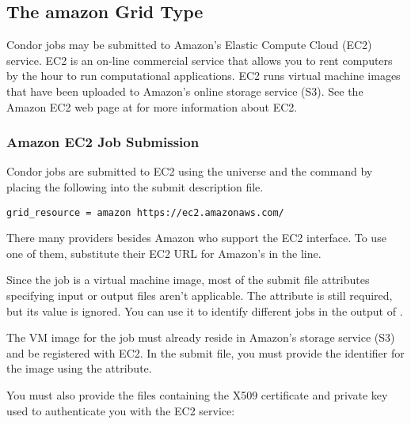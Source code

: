 \subsection{\label{sec:Amazon}The amazon Grid Type }

Condor jobs may be submitted to Amazon's Elastic Compute Cloud (EC2)
service.
EC2 is an on-line commercial service that allows you to rent computers
by the hour to run computational applications.
EC2 runs virtual machine images that have been uploaded to Amazon's
online storage service (S3).
See the Amazon EC2 web page at  for more
information about EC2.

\subsubsection{\label{sec:Amazon-submit}Amazon EC2 Job Submission}

Condor jobs are submitted to EC2
using the  universe and the
 command  by placing the following
into the submit description file.
\begin{verbatim}
grid_resource = amazon https://ec2.amazonaws.com/
\end{verbatim}

There many providers besides Amazon who support the EC2 interface.
To use one of them, substitute their EC2 URL for Amazon's in the
 line.

Since the job is a virtual machine image, most of the submit file
attributes specifying input or output files aren't applicable. The
 attribute is still required, but its value is
ignored. You can use it to identify different jobs in the output of
.

The VM image for the job must already reside in Amazon's storage
service (S3) and be registered with EC2. In the submit file, you
must provide the identifier for the image using the
 attribute.

You must also provide the files containing the X509 certificate and
private key used to authenticate you with the EC2 service:

